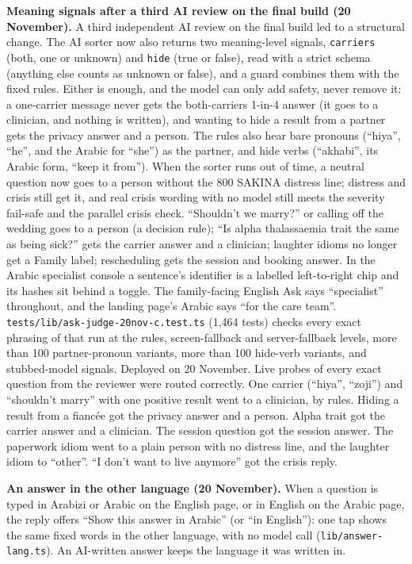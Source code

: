 \documentclass[10.5pt,a4paper]{article}
\newcommand{\code}[1]{\texttt{\small #1}}
\newcommand{\file}[1]{\leavevmode\textcolor{muted}{\texttt{\small #1}}}
\begin{document}
\textbf{Meaning signals after a third AI review on the final build (20 November).} A third independent AI review on the
final build led to a structural change. The AI sorter now also returns two meaning-level signals,
\code{carriers} (both, one or unknown) and \code{hide} (true or false), read with a strict schema (anything else counts
as unknown or false), and a guard combines them with the fixed rules. Either is enough, and the model can only add
safety, never remove it: a one-carrier message never gets the both-carriers 1-in-4 answer (it goes to a clinician, and
nothing is written), and wanting to hide a result from a partner gets the privacy answer and a person. The rules also
hear bare pronouns (``hiya'', ``he'', and the Arabic for ``she'') as the partner, and hide verbs (``akhabi'', its Arabic
form, ``keep it from''). When the sorter runs out of time, a neutral question now goes to a person without the 800
SAKINA distress line; distress and crisis still get it, and real crisis wording with no model still meets the severity
fail-safe and the parallel crisis check. ``Shouldn't we marry?'' or calling off the wedding goes to a person (a decision
rule); ``Is alpha thalassaemia trait the same as being sick?'' gets the carrier answer and a clinician; laughter idioms
no longer get a Family label; rescheduling gets the session and booking answer. In the Arabic specialist console a
sentence's identifier is a labelled left-to-right chip and its hashes sit behind a toggle. The family-facing English Ask
says ``specialist'' throughout, and the landing page's Arabic says ``for the care team''.
\file{tests/lib/ask-judge-20nov-c.test.ts} (1,464 tests) checks every exact phrasing of that run at the rules,
screen-fallback and server-fallback levels, more than 100 partner-pronoun variants, more than 100 hide-verb variants,
and stubbed-model signals. Deployed on 20 November. Live probes of every exact question from the
reviewer were routed correctly. One carrier (``hiya'', ``zoji'') and ``shouldn't marry'' with one positive result went to
a clinician, by rules. Hiding a result from a fianc\'ee got the privacy answer and a person. Alpha trait got the carrier
answer and a clinician. The session question got the session answer. The paperwork idiom went to a plain person with no
distress line, and the laughter idiom to ``other''. ``I don't want to live anymore'' got the crisis reply.

\textbf{An answer in the other language (20 November).} When a question is typed in Arabizi or Arabic on the English
page, or in English on the Arabic page, the reply offers ``Show this answer in Arabic'' (or ``in English''): one tap
shows the same fixed words in the other language, with no model call (\file{lib/answer-lang.ts}). An AI-written answer
keeps the language it was written in.
\end{document}
